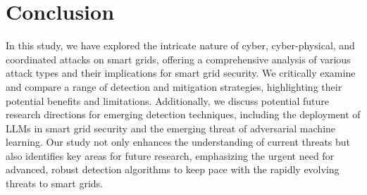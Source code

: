 \documentclass[10pt, journal]{IEEEtran}
\begin{document}

\section{Conclusion}
\label{section:conclusion}
 
In this study, we have explored the intricate nature of cyber, cyber-physical, and coordinated attacks on smart grids, offering a comprehensive analysis of various attack types and their implications for smart grid security. We critically examine and compare a range of detection and mitigation strategies, highlighting their potential benefits and limitations. Additionally, we discuss potential future research directions for emerging detection techniques, including the deployment of LLMs in smart grid security and the emerging threat of adversarial machine learning. Our study not only enhances the understanding of current threats but also identifies key areas for future research, emphasizing the urgent need for advanced, robust detection algorithms to keep pace with the rapidly evolving threats to smart grids.



\end{document}
